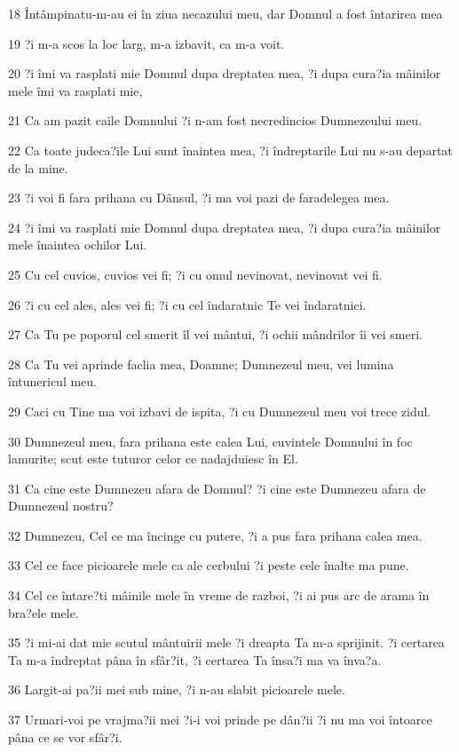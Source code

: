 \par 18 Întâmpinatu-m-au ei în ziua necazului meu, dar Domnul a fost întarirea mea
\par 19 ?i m-a scos la loc larg, m-a izbavit, ca m-a voit.
\par 20 ?i îmi va rasplati mie Domnul dupa dreptatea mea, ?i dupa cura?ia mâinilor mele îmi va rasplati mie,
\par 21 Ca am pazit caile Domnului ?i n-am fost necredincios Dumnezeului meu.
\par 22 Ca toate judeca?ile Lui sunt înaintea mea, ?i îndreptarile Lui nu s-au departat de la mine.
\par 23 ?i voi fi fara prihana cu Dânsul, ?i ma voi pazi de faradelegea mea.
\par 24 ?i îmi va rasplati mie Domnul dupa dreptatea mea, ?i dupa cura?ia mâinilor mele înaintea ochilor Lui.
\par 25 Cu cel cuvios, cuvios vei fi; ?i cu omul nevinovat, nevinovat vei fi.
\par 26 ?i cu cel ales, ales vei fi; ?i cu cel îndaratnic Te vei îndaratnici.
\par 27 Ca Tu pe poporul cel smerit îl vei mântui, ?i ochii mândrilor îi vei smeri.
\par 28 Ca Tu vei aprinde faclia mea, Doamne; Dumnezeul meu, vei lumina întunericul meu.
\par 29 Caci cu Tine ma voi izbavi de ispita, ?i cu Dumnezeul meu voi trece zidul.
\par 30 Dumnezeul meu, fara prihana este calea Lui, cuvintele Domnului în foc lamurite; scut este tuturor celor ce nadajduiesc în El.
\par 31 Ca cine este Dumnezeu afara de Domnul? ?i cine este Dumnezeu afara de Dumnezeul nostru?
\par 32 Dumnezeu, Cel ce ma încinge cu putere, ?i a pus fara prihana calea mea.
\par 33 Cel ce face picioarele mele ca ale cerbului ?i peste cele înalte ma pune.
\par 34 Cel ce întare?ti mâinile mele în vreme de razboi, ?i ai pus arc de arama în bra?ele mele.
\par 35 ?i mi-ai dat mie scutul mântuirii mele ?i dreapta Ta m-a sprijinit. ?i certarea Ta m-a îndreptat pâna în sfâr?it, ?i certarea Ta însa?i ma va înva?a.
\par 36 Largit-ai pa?ii mei sub mine, ?i n-au slabit picioarele mele.
\par 37 Urmari-voi pe vrajma?ii mei ?i-i voi prinde pe dân?ii ?i nu ma voi întoarce pâna ce se vor sfâr?i.
